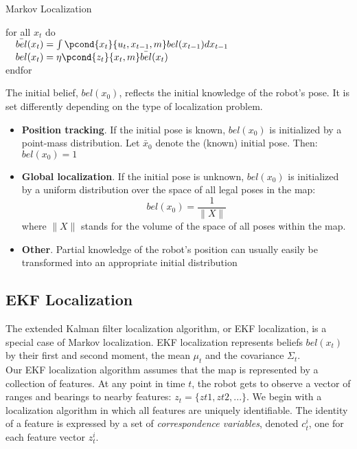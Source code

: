 \begin{algorithm}[H]
\caption{Markov Localization}

\BlankLine
for all $x_t$ do \\
$ \quad \bar{bel}(x_t) = \int{\pcond{x_t}{u_t, x_{t-1}, m} bel(x_{t-1})} dx_{t-1} $ \\
$\quad bel(x_t) = \eta \pcond{z_t}{x_t, m} \bar{bel}(x_t)$\\
endfor
\BlankLine
{}
\end{algorithm}
The initial belief, $bel(x_0)$, reflects the initial knowledge of the robot’s pose. It is set differently depending on the type of localization problem.
\begin{itemize}
  \item \textbf{Position tracking}. If the initial pose is known, $bel(x_0)$ is initialized by a point-mass distribution. Let $\bar{x}_0$ denote the (known) initial pose. Then: $bel(x_0) = 1$

  \item \textbf{Global localization}. If the initial pose is unknown, $bel(x_0)$ is initialized by a uniform distribution over the space of all legal poses in the map:
    \begin{equation}
      bel(x_0) = \frac{1}{\|X\|}
      \label{eq:global markov localization}
    \end{equation}
    where $\|X\|$ stands for the volume of the space of all poses within the map.
  \item \textbf{Other}. Partial knowledge of the robot’s position can usually easily be transformed into an appropriate initial distribution
\end{itemize}

\newpage

\subsection{EKF Localization}
The extended Kalman filter localization algorithm, or EKF localization, is a special case of Markov localization.
EKF localization represents beliefs $bel(x_t)$ by their first and second moment, the mean $\mu_t$ and the covariance $\Sigma_t$.\\

Our EKF localization algorithm assumes that the map is represented by a collection of features.
At any point in time $t$, the robot gets to observe a vector of ranges and bearings to nearby features: $z_t = \{zt 1, zt 2 ,...\}$.
We begin with a localization algorithm in which all features are uniquely identifiable.
The identity of a feature is expressed by a set of \textit{correspondence variables}, denoted $c_t^i$, one for each feature vector $z_t^i$.\\

